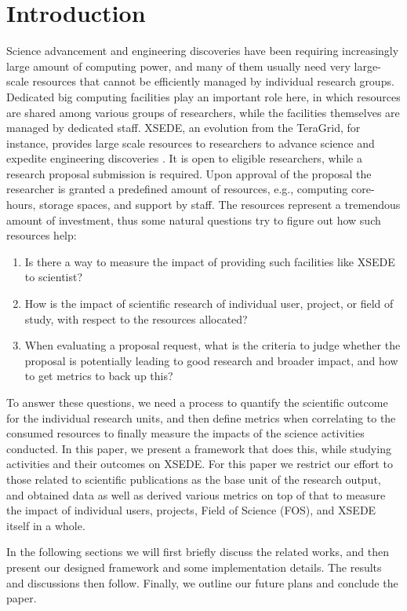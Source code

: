 \section{Introduction}

Science advancement and engineering discoveries have been requiring increasingly large amount of computing power, and many of them usually need very large-scale resources that cannot be efficiently managed by individual research groups. Dedicated big computing facilities play an important role here, in which resources are shared among various groups of researchers, while the facilities themselves are managed by dedicated staff. XSEDE, an evolution from the TeraGrid, for instance, provides large scale resources to researchers to advance science and expedite engineering discoveries \cite{www-xsede}. It is open to eligible researchers, while a research proposal submission is required. Upon approval of the proposal the researcher is granted a predefined amount of resources, e.g., computing core-hours, storage spaces, and support by staff. The resources represent a tremendous amount of investment, thus some natural questions try to figure out how such resources help: 

\begin{enumerate}
\item Is there a way to measure the impact of providing such facilities like XSEDE to scientist? 

\item How is the impact of scientific research of individual user, project, or field of study, with respect to the resources allocated? 

\item When evaluating a proposal request, what is the criteria to judge whether the proposal is potentially leading to good research and broader impact, and how to get metrics to back up this?
\end{enumerate}

To answer these questions, we need a process to quantify the scientific outcome for the individual research units, and then define metrics when correlating to the consumed resources to finally measure the impacts of the science activities conducted. In this paper, we present a framework that does this, while studying activities and their outcomes on XSEDE. For this paper we restrict our effort to those related to scientific publications as the base unit of the research output, and obtained data as well as derived various metrics on top of that to measure the impact of individual users, projects, Field of Science (FOS), and XSEDE itself in a whole.

In the following sections we will first briefly discuss the related works, and then present our designed framework and some implementation details. The results and discussions then follow. Finally, we outline our future plans and conclude the paper.

